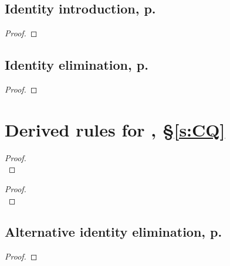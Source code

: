 \begin{multicols}{2}
\subsection*{Identity introduction, p.\ \pageref{idint}}

\begin{proof}
	 \idi{}
\end{proof}


\subsection*{Identity elimination, p.\ \pageref{idelim}}

\begin{proof}
	 
\end{proof}
\end{multicols}

\section*{Derived rules for \FOL, §\ref{s:CQ}}
\begin{multicols}{2}
\begin{proof}

\\	
\end{proof}
\begin{proof}

\\	
\end{proof}

\subsection*{Alternative identity elimination, p.\ \pageref{id.es}}
\begin{proof}
	 
	\end{proof}
\end{multicols}
